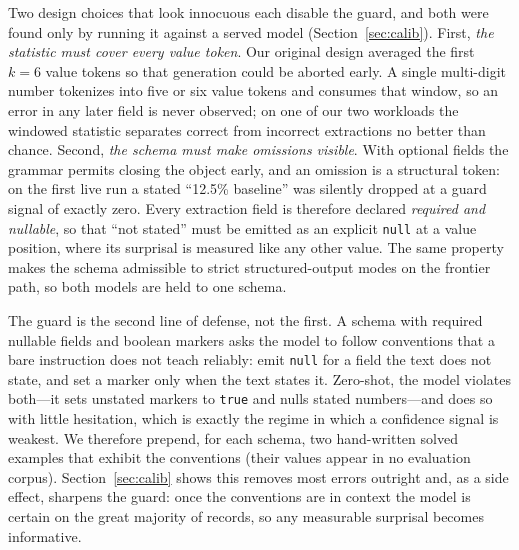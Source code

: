\documentclass[conference]{IEEEtran}
\begin{document}
Two design choices that look innocuous each disable the guard, and both were found only by running it against a served model (Section~\ref{sec:calib}). First, \emph{the statistic must cover every value token}. Our original design averaged the first $k{=}6$ value tokens so that generation could be aborted early. A single multi-digit number tokenizes into five or six value tokens and consumes that window, so an error in any later field is never observed; on one of our two workloads the windowed statistic separates correct from incorrect extractions no better than chance. Second, \emph{the schema must make omissions visible}. With optional fields the grammar permits closing the object early, and an omission is a structural token: on the first live run a stated ``12.5\% baseline'' was silently dropped at a guard signal of exactly zero. Every extraction field is therefore declared \emph{required and nullable}, so that ``not stated'' must be emitted as an explicit \texttt{null} at a value position, where its surprisal is measured like any other value. The same property makes the schema admissible to strict structured-output modes on the frontier path, so both models are held to one schema.

The guard is the second line of defense, not the first. A schema with required nullable fields and boolean markers asks the model to follow conventions that a bare instruction does not teach reliably: emit \texttt{null} for a field the text does not state, and set a marker only when the text states it. Zero-shot, the model violates both---it sets unstated markers to \texttt{true} and nulls stated numbers---and does so with little hesitation, which is exactly the regime in which a confidence signal is weakest. We therefore prepend, for each schema, two hand-written solved examples that exhibit the conventions (their values appear in no evaluation corpus). Section~\ref{sec:calib} shows this removes most errors outright and, as a side effect, sharpens the guard: once the conventions are in context the model is certain on the great majority of records, so any measurable surprisal becomes informative.
\end{document}
